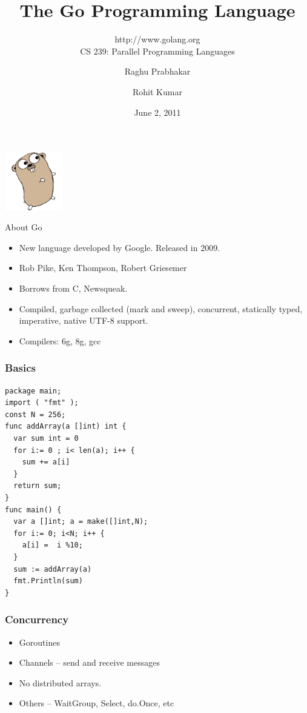 \documentclass{beamer}
\title{The Go Programming Language}
\subtitle{http://www.golang.org \\ CS 239: Parallel Programming Languages}
\author{Raghu Prabhakar \and Rohit Kumar}
\date{June 2, 2011}
\begin{document}
\begin{frame}
\begin{center}
\includegraphics[width=1in]{gopher.png}
\end{center}
\titlepage
\end{frame}

\begin{frame} {About Go}
\begin{itemize}
  \item New language developed by Google. Released in 2009.
  \item Rob Pike, Ken Thompson, Robert Griesemer
  \item Borrows from C, Newsqueak.
  \item Compiled, garbage collected (mark and sweep), concurrent, statically typed,
    imperative, native UTF-8 support.
  \item Compilers: 6g, 8g, gcc 
\end{itemize}
\end{frame}

\begin{frame}[fragile]
\frametitle{Basics}
    {\small
\begin{verbatim}
package main;
import ( "fmt" );
const N = 256;
func addArray(a []int) int {
  var sum int = 0
  for i:= 0 ; i< len(a); i++ {
    sum += a[i]
  }
  return sum;
}
func main() {
  var a []int; a = make([]int,N);
  for i:= 0; i<N; i++ {
    a[i] =  i %10; 
  }
  sum := addArray(a)
  fmt.Println(sum) 
}		
\end{verbatim}
}
\end{frame}

\begin{frame}[fragile]
\frametitle{Concurrency}
  \begin{itemize}
    \item Goroutines
    \item Channels -- send and receive messages
    \item No distributed arrays. 
    \item Others -- WaitGroup, Select, do.Once, etc    
  \end{itemize}
\end{frame}
\end{document}
